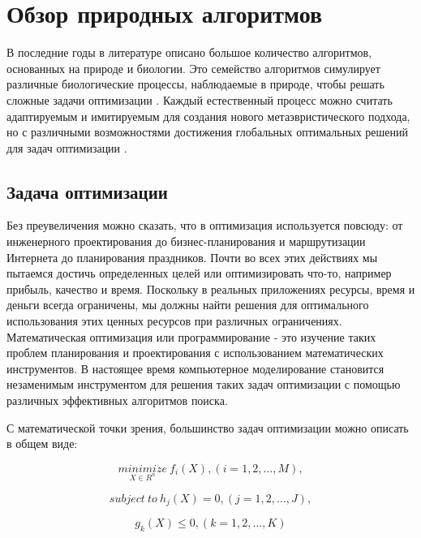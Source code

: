 \section{Обзор природных алгоритмов}\label{Section:Bio}

В последние годы в литературе описано большое количество алгоритмов,
основанных на природе и биологии. Это семейство алгоритмов симулирует
различные биологические процессы, наблюдаемые в природе, чтобы решать
сложные задачи оптимизации \cite{Yang2009}. Каждый естественный процесс
можно считать адаптируемым и имитируемым для создания нового
метаэвристического подхода, но с различными возможностями достижения
глобальных оптимальных решений для задач оптимизации \cite{BioInspiredTaxonomy}.

\subsection{Задача оптимизации}

Без преувеличения можно сказать, что в оптимизация используется повсюду: от
инженерного проектирования до бизнес-планирования и маршрутизации
Интернета до планирования праздников. Почти во всех этих действиях мы
пытаемся достичь определенных целей или оптимизировать что-то, например
прибыль, качество и время. Поскольку в реальных приложениях ресурсы,
время и деньги всегда ограничены, мы должны найти решения для оптимального
использования этих ценных ресурсов при различных ограничениях.
Математическая оптимизация или программирование - это изучение таких
проблем планирования и проектирования с использованием математических
инструментов. В настоящее время компьютерное моделирование становится
незаменимым инструментом для решения таких задач оптимизации с помощью
различных эффективных алгоритмов поиска.

С математической точки зрения, большинство задач оптимизации можно описать
в общем виде:

\begin{equation}\label{eq7}
    \underset{X \in R^n}{minimize} \: f_i(X), (i=1,2,\dots,M),
\end{equation}

\begin{equation}\label{eq8}
    subject\: to \: h_j(X) = 0, (j=1,2,\dots,J),
\end{equation}

\begin{equation}\label{eq9}
    g_k(X) \leq 0, (k=1,2,\dots,K)
\end{equation}

